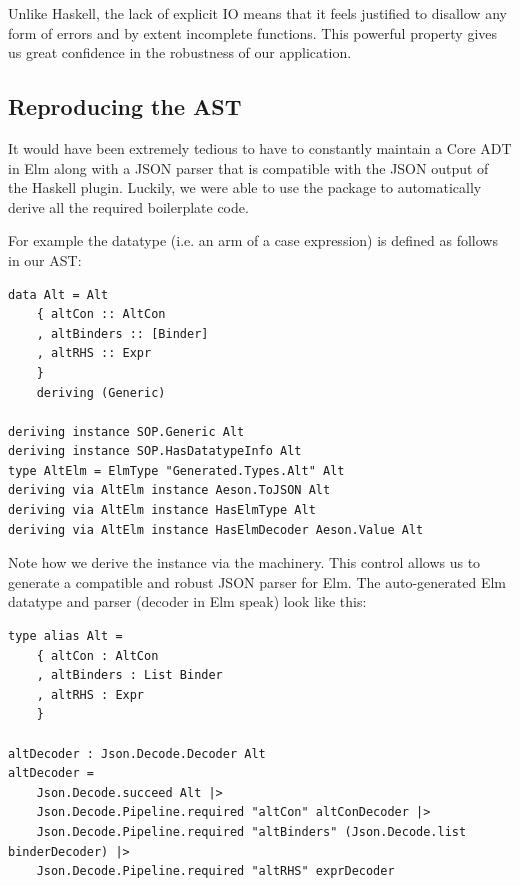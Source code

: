 Unlike Haskell, the lack of explicit IO means that it feels justified to disallow any form of errors and by extent incomplete functions.
This powerful property gives us great confidence in the robustness of our application.

\subsection{Reproducing the AST}

It would have been extremely tedious to have to constantly maintain a Core ADT in Elm along with a JSON
parser that is compatible with the JSON output of the Haskell plugin. Luckily, we were able to use the
 \cite{haskell_to_elm} package to automatically derive all the required boilerplate code.

For example the  datatype (i.e. an arm of a case expression) is defined as follows in our AST:

\begin{listing}[H]
\begin{verbatim}
data Alt = Alt
    { altCon :: AltCon
    , altBinders :: [Binder]
    , altRHS :: Expr
    }
    deriving (Generic)

deriving instance SOP.Generic Alt
deriving instance SOP.HasDatatypeInfo Alt
type AltElm = ElmType "Generated.Types.Alt" Alt
deriving via AltElm instance Aeson.ToJSON Alt
deriving via AltElm instance HasElmType Alt
deriving via AltElm instance HasElmDecoder Aeson.Value Alt
\end{verbatim}
\end{listing}

Note how we derive the  instance via the  machinery. This control allows
us to generate a compatible and robust JSON parser for Elm. The auto-generated Elm datatype and parser
(decoder in Elm speak) look like this:

\begin{listing}[H]
\begin{verbatim}
type alias Alt =
    { altCon : AltCon
    , altBinders : List Binder
    , altRHS : Expr
    }

altDecoder : Json.Decode.Decoder Alt
altDecoder =
    Json.Decode.succeed Alt |>
    Json.Decode.Pipeline.required "altCon" altConDecoder |>
    Json.Decode.Pipeline.required "altBinders" (Json.Decode.list binderDecoder) |>
    Json.Decode.Pipeline.required "altRHS" exprDecoder
\end{verbatim}
\end{listing}

